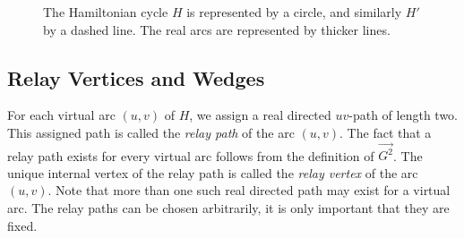 \documentclass[12pt,letterpaper,oneside]{book}
\begin{document}
\begin{figure} 
\centering 
{} 
\caption[A forbidden configuration based on minimality]
{The Hamiltonian cycle $H$ is represented by a circle, and similarly $H'$ by a dashed line.  
The real arcs are represented by thicker lines.  \label{fig:forbid}} 
\end{figure} 
 

 \newpage
\subsection{Relay Vertices and Wedges}



For each virtual arc $(u,v)$ of $H$, we assign  
a real directed $uv$-path of length two.   
This assigned path is called the \emph{relay path} of the arc $(u,v)$.   
The fact that a relay path exists for every virtual arc follows from the definition of $\vec{G^2}$.   
The unique internal vertex of the relay path  
is called the \emph{relay vertex} of the arc $(u,v)$.  Note that more than one such real directed path may exist for  
a virtual arc.  The relay paths can be chosen arbitrarily, it is only important that they are fixed.   
   
 
 
\end{document}
